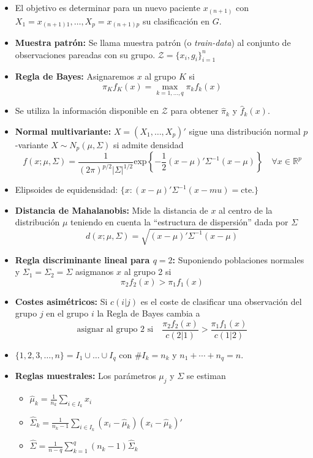 \begin{itemize}
    \item El objetivo es determinar para un nuevo paciente $x_{(n+1)}$ con $X_1=x_{(n+1)1},\dots,X_p=x_{(n+1)p}$ su clasificación en $G$.
    \item \textbf{Muestra patrón:} Se llama muestra patrón (o \textit{train-data}) al conjunto de observaciones pareadas con su grupo. $\mathcal{Z}=\{x_i,g_i\}_{i=1}^n$
    \item \textbf{Regla de Bayes:} Asignaremos $x$ al grupo $K$ si
    \[
        \pi_Kf_K(x)=\max_{k=1,\dots,q}\pi_kf_k(x)
    \]
    \item Se utiliza la información disponible en $\mathcal{Z}$ para obtener $\hat{\pi}_k$ y $\hat{f}_k(x)$.
    \item \textbf{Normal multivariante:} $X=(X_1,\dots,X_p)'$ sigue una distribución normal $p$-variante $X\sim N_p(\mu,\Sigma)$ si admite densidad
    \[
        f(x;\mu,\Sigma)=\frac{1}{(2\pi)^{p/2}|\Sigma|^{1/2}}\text{exp}\left\{-\frac{1}{2}(x-\mu)'\Sigma^{-1}(x-\mu)\right\} \quad \forall x \in \mathbb{R}^p
    \]
    \item Elipsoides de equidensidad: $\{x:(x-\mu)'\Sigma^{-1}(x-mu)=\text{cte.}\}$
    \item \textbf{Distancia de Mahalanobis:} Mide la distancia de $x$ al centro de la distribución $\mu$ teniendo en cuenta la ``estructura de dispersión'' dada por $\Sigma$
    \[
        d(x;\mu,\Sigma)=\sqrt{(x-\mu)'\Sigma^{-1}(x-\mu)}
    \]
    \item \textbf{Regla discriminante lineal para $q=2$:} Suponiendo poblaciones normales y $\Sigma_1=\Sigma_2=\Sigma$ asigmanos $x$ al grupo 2 si
    \[
        \pi_2f_2(x)>\pi_1f_1(x)
    \]
    \item \textbf{Costes asimétricos:} Si $c(i|j)$ es el coste de clasificar una observación del grupo $j$ en el grupo $i$ la Regla de Bayes cambia a
    \[
        \text{asignar al grupo 2 si} \quad \frac{\pi_2f_2(x)}{c(2|1)}>\frac{\pi_1f_1(x)}{c(1|2)}
    \]
    \item $\{1,2,3,\dots,n\}=I_1\cup\dots\cup I_q$ con $\#I_k=n_k$ y $n_1+\cdots+n_q=n$.
    \newpage
    \item \textbf{Reglas muestrales:} Los parámetros $\mu_j$ y $\Sigma$ se estiman
    \begin{itemize}
        \item $\hat{\mu}_k=\frac{1}{n_k}\sum_{i\in I_k}x_i$
        \item $\hat{\Sigma}_k=\frac{1}{n_k-1}\sum_{i\in I_k}(x_i-\hat{\mu}_k)(x_i-\hat{\mu}_k)'$
        \item $\hat{\Sigma}=\frac{1}{n-q}\sum_{k=1}^q(n_k-1)\hat{\Sigma}_k$

\end{itemize}
\end{itemize}
